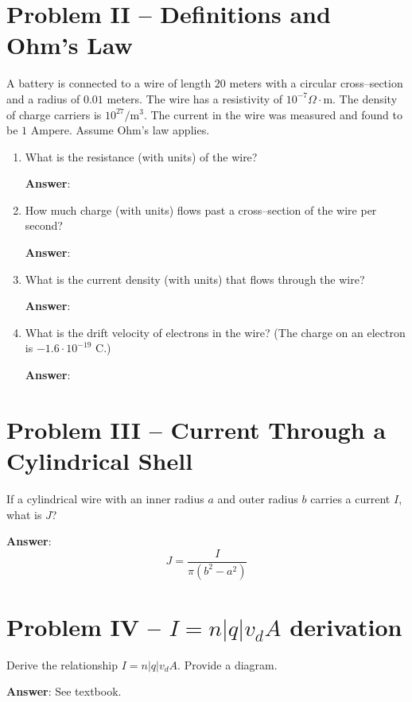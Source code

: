 \documentclass{article}
\begin{document}
\newpage

\section{Problem II -- Definitions and Ohm's Law}

A battery is connected to a wire of length $20$ meters with a circular cross--section and a radius of $0.01$ meters. The wire has a resistivity of $10^{-7}\Omega\cdot\text{m}$. The density of charge carriers is $10^{27}/\text{m}^3$. The current in the wire was measured and found to be $1$ Ampere. Assume Ohm's law applies.

\begin{enumerate}

  \item What is the resistance (with units) of the wire?

        \ifsolutions
        \textbf{Answer}:
        \else
        \vskip 84pt
        \fi

  \item How much charge (with units) flows past a cross--section of the wire per second?

        \ifsolutions
        \textbf{Answer}:
        \else
        \vskip 84pt
        \fi

  \item What is the current density (with units) that flows through the wire?

        \ifsolutions
        \textbf{Answer}:
        \else
        \vskip 84pt
        \fi

  \item What is the drift velocity of electrons in the wire? (The charge on an electron is $-1.6·10^{-19}\text{ C}$.)

        \ifsolutions
        \textbf{Answer}:
        \else
        \vskip 84pt
        \fi

\end{enumerate}

\newpage

\section{Problem III -- Current Through a Cylindrical Shell}

If a cylindrical wire with an inner radius $a$ and outer radius $b$ carries a current $I$, what is $J$?

\ifsolutions
\textbf{Answer}: $$J=\frac{I}{\pi(b^2-a^2)}$$
\else
\vskip 84pt
\fi

\section{Problem IV -- $I = n|q|v_dA$ derivation}

Derive the relationship $I = n|q|v_dA$. Provide a diagram.

\ifsolutions
\textbf{Answer}: See textbook.
\else

\fi
\end{document}
